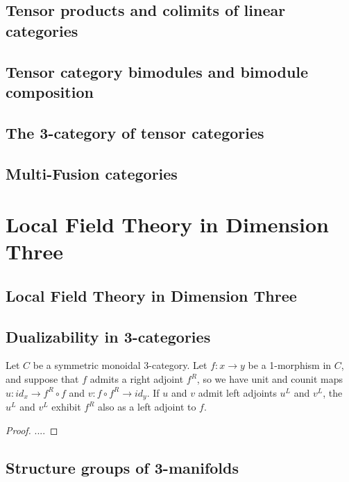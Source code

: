 \documentclass{amsart}
\begin{document}
\subsection{Tensor products and colimits of linear categories}
\subsection{Tensor category bimodules and bimodule composition}
\subsection{The 3-category of tensor categories}
\subsection{Multi-Fusion categories}



\section{Local Field Theory in Dimension Three}

\subsection{Local Field Theory in Dimension Three}
\subsection{Dualizability in 3-categories}


\begin{proposition}
	Let $C$ be a symmetric monoidal 3-category. Let $f: x \to y$ be a 1-morphism in $C$, and suppose that $f$ admits a right adjoint $f^R$,  so we have unit and counit maps $u:id_x \to f^R \circ f$ and $v:f \circ f^R \to id_y$. If $u$ and $v$ admit left adjoints $u^L$ and $v^L$, the $u^L$ and $v^L$ exhibit $f^R$ also as a left adjoint to $f$. 
\end{proposition}

\begin{proof}
	....
\end{proof}

\subsection{Structure groups of 3-manifolds}
\end{document}

